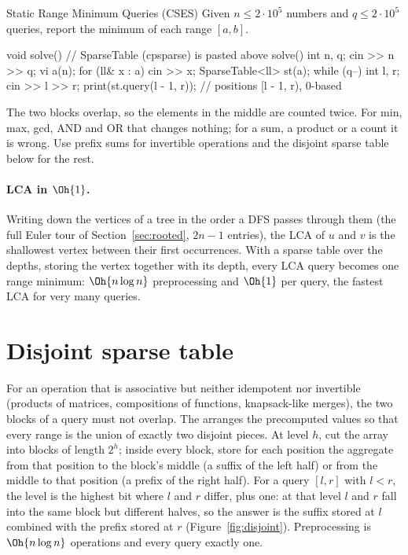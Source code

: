 \begin{problem}{Static Range Minimum Queries (CSES)}
Given $n \le 2 \cdot 10^5$ numbers and $q \le 2 \cdot 10^5$ queries, report the minimum of each range $[a, b]$.
\end{problem}

\begin{code}
void solve() {  // SparseTable (cpsparse) is pasted above solve()
    int n, q;
    cin >> n >> q;
    vi a(n);
    for (ll& x : a) cin >> x;
    SparseTable<ll> st(a);
    while (q--) {
        int l, r;
        cin >> l >> r;
        print(st.query(l - 1, r));  // positions [l - 1, r), 0-based
    }
}
\end{code}


\begin{pitfall}
The two blocks overlap, so the elements in the middle are counted twice. For min, max, gcd, AND and OR that changes nothing; for a
sum, a product or a count it is wrong. Use prefix sums for invertible operations and the disjoint sparse table below for the
rest.
\end{pitfall}

\paragraph{LCA in $\Oh{1}$.} Writing down the vertices of a tree in the order a DFS passes through them (the full Euler tour of
Section~\ref{sec:rooted}, $2n - 1$ entries), the LCA of $u$ and $v$ is the shallowest vertex between their first occurrences. With a
sparse table over the depths, storing the vertex together with its depth, every LCA query becomes one range minimum: $\Oh{n \log n}$
preprocessing and $\Oh{1}$ per query, the fastest LCA for very many queries.

\section[Disjoint sparse table]{Disjoint sparse table \hfill \plat}\label{sec:disjointsparse}

For an operation that is associative but neither idempotent nor invertible (products of matrices, compositions of functions,
knapsack-like merges), the two blocks of a query must not overlap. The  arranges the precomputed values
so that every range is the union of exactly two disjoint pieces. At level $h$, cut the array into blocks of length $2^h$; inside every
block, store for each position the aggregate from that position to the block's middle (a suffix of the left half) or from the
middle to that position (a prefix of the right half). For a query $[l, r]$ with $l < r$, the level is the highest bit where $l$ and
$r$ differ, plus one: at that level $l$ and $r$ fall into the same block but different halves, so the answer is the suffix stored at
$l$ combined with the prefix stored at $r$ (Figure~\ref{fig:disjoint}). Preprocessing is $\Oh{n \log n}$ operations and every query
exactly one.


